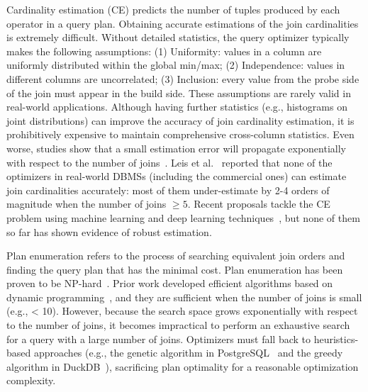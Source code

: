 Cardinality estimation (CE) predicts the number of tuples produced by each operator in a query plan. Obtaining accurate estimations of the join cardinalities is extremely difficult. Without detailed statistics, the query optimizer typically makes the following assumptions: (1) Uniformity: values in a column are uniformly distributed within the global min/max; (2) Independence: values in different columns are uncorrelated; (3) Inclusion: every value from the probe side of the join must appear in the build side. These assumptions are rarely valid in real-world applications. Although having further statistics (e.g., histograms on joint distributions) can improve the accuracy of join cardinality estimation, it is prohibitively expensive to maintain comprehensive cross-column statistics. Even worse, studies show that a small estimation error will propagate exponentially with respect to the number of joins~\cite{1991errorpropagation,robustoptimization}. Leis et al.~\cite{leis2015HowGood} reported that none of the optimizers in real-world DBMSs (including the commercial ones) can estimate join cardinalities accurately: most of them under-estimate by 2-4 orders of magnitude when the number of joins $\ge 5$. Recent proposals tackle the CE problem using machine learning and deep learning techniques~\cite{2019MSCN, 2019Naru, 2019light_ML, halford2019bayesian, 2020deepdb, zhu2020flat, 2020deep, park2020quicksel, shetiya2020astrid, yang2020neurocard, liu2021fauce, wu2021unified}, but none of them so far has shown evidence of robust estimation.

Plan enumeration refers to the process of searching equivalent join orders and finding the query plan that has the minimal cost. Plan enumeration has been proven to be NP-hard~\cite{1984NP}. Prior work developed efficient algorithms based on dynamic programming~\cite{moerkotte2006DPccp, 2008dphyper}, and they are sufficient when the number of joins is small (e.g., < 10). However, because the search space grows exponentially with respect to the number of joins, it becomes impractical to perform an exhaustive search for a query with a large number of joins. Optimizers must fall back to heuristics-based approaches (e.g., the genetic algorithm in PostgreSQL~\cite{Postgres} and the greedy algorithm in DuckDB~\cite{duckdb}), sacrificing plan optimality for a reasonable optimization complexity.


